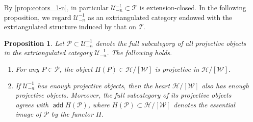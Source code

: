 \documentclass[a4paper,reqno,10pt]{amsart}
\newtheorem{proposition}[proposition]{Proposition}
\theoremstyle{definition}
\theoremstyle{definition}
\theoremstyle{definition}
\theoremstyle{definition}
\theoremstyle{plain}
\def\add{\operatorname{\mathsf{add}}}
\newcommand{\CH}{\mathcal{H}}
\newcommand{\CP}{\mathcal{P}}
\newcommand{\CT}{\mathcal{T}}
\newcommand{\CU}{\mathcal{U}}
\newcommand{\CW}{\mathcal{W}}
\begin{document}
By \cref{prop:cotors_1-n}, in particular $\CU_{-n}^{-1}\subset\CT$ is extension-closed.
In the following proposition, we regard $\CU_{-n}^{-1}$ as an extriangulated category endowed with the extriangulated structure induced by that on $\CT$. 
\begin{proposition}\label{prop:enough-proj}
Let $\CP\subset \CU_{-n}^{-1}$ denote the full subcategory of all projective objects in the extriangulated category $\CU_{-n}^{-1}$. The following holds.
\begin{enumerate}
\item For any $P\in\CP$, the object $H(P)\in\CH/[\CW]$ is projective in $\CH/[\CW]$.
\item If $\CU_{-n}^{-1}$ has enough projective objects, then the heart $\CH/[\CW]$ also has enough projective objects. Moreover, the full subcategory of its projective objects agrees with $\add H(\CP)$, where $H(\CP)\subset \CH/[\CW]$ denotes the essential image of $\CP$ by the functor $H$.
\end{enumerate}
\end{proposition}
\end{document}

